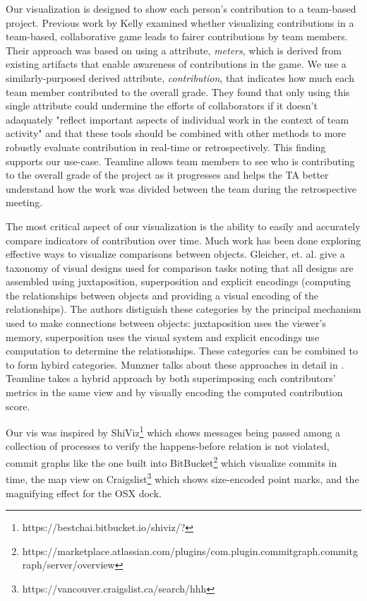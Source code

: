 \documentclass[../manifest.tex]{subfiles}
\begin{document}
Our visualization is designed to show each person's contribution to a team-based project. Previous work by Kelly \cite{Kelly:2016} examined whether visualizing contributions in a team-based, collaborative game leads to fairer contributions by team members. Their approach was based on using a attribute, \textit{meters}, which is derived from existing artifacts that enable awareness of contributions in the game. We use a similarly-purposed derived attribute, \textit{contribution}, that indicates how much each team member contributed to the overall grade. They found that only using this single attribute could undermine the efforts of collaborators if it doesn't adaquately "reflect important aspects of individual work in the context of team activity" and that these tools should be combined with other methods to more robustly evaluate contribution in real-time or retrospectively. This finding supports our use-case. Teamline allows team members to see who is contributing to the overall grade of the project as it progresses and helps the TA better understand how the work was divided between the team during the retrospective meeting.

The most critical aspect of our visualization is the ability to easily and accurately compare indicators of contribution over time. Much work has been done exploring effective ways to visualize comparisons between objects. Gleicher, et. al.\cite{Gleicher:2011} give a taxonomy of visual designs used for comparison tasks noting that all designs are assembled using juxtaposition, superposition and explicit encodings (computing the relationships between objects and providing a visual encoding of the relationships). The authors distiguish these categories by the principal mechanism used to make connections between objects: juxtaposition uses the viewer’s memory, superposition uses the visual system and explicit encodings use computation to determine the relationships. These categories can be combined to to form hybird categories. Munzner talks about these approaches in detail in \cite{Munzner:2014}. Teamline takes a hybrid approach by both superimposing each contributors' metrics in the same view and by visually encoding the computed contribution score.

Our vis was inspired by ShiViz\footnote{https://bestchai.bitbucket.io/shiviz/?}\cite{Abrahamson:2014} which shows messages being passed among a collection of processes to verify the happens-before relation is not violated, commit graphs like the one built into BitBucket\footnote{https://marketplace.atlassian.com/plugins/com.plugin.commitgraph.commitgraph/server/overview} which visualize commits in time, the map view on Craigslist\footnote{https://vancouver.craigslist.ca/search/hhh} which shows size-encoded point marks, and the magnifying effect for the OSX dock.
\end{document}
